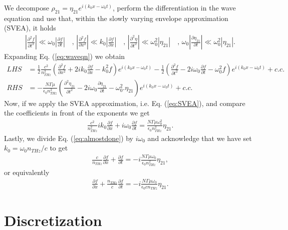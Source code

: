 \documentclass[preprint,secnumarabic,amssymb, nobibnotes, aip, prd]{revtex4-1}
\def\p{\partial}
\begin{document}
We decompose $\rho_{21}=\eta_{21}e^{i(k_0x-\omega_0t)}$, perform the differentiation in the wave equation and use that, within the slowly varying envelope approximation (SVEA), it holds
\begin{align}
\label{eq:SVEA}
\left |\frac{\p^2 f}{\p t^2}\right | \ll \omega_0\left|\frac{\p f}{\p t}\right| \quad \text{, } \left |\frac{\p^2 f}{\p x^2}\right | \ll k_0\left|\frac{\p f}{\p x}\right| \quad \text{, } \left |\frac{\p^2 \eta}{\p t^2}\right | \ll \omega_0^2 \left| \eta_{21}\right| \quad \text{, } \omega_0 \left| \frac{\p \eta_{21}}{\p t}\right| \ll  \omega_0^2\left|\eta_{21}\right|.
\end{align}
Expanding Eq. (\ref{eq:waveqn}) we obtain
\begin{align}
LHS &= \frac{1}{2} \frac{c^2}{n_{THz}^2} \left(\frac{\p^2 f}{\p x^2} +2ik_0 \frac{\p f}{\p x} -k_0^2 f\right)e^{i(k_0x-\omega_0t)} - \frac{1}{2}\left(\frac{\p^2 f}{\p t^2} -2i\omega_0 \frac{\p f}{\p t} -\omega_0^2 f\right)e^{i(k_0x-\omega_0t)} + c.c. \nonumber \\
RHS &= -\frac{N\Gamma\mu}{\epsilon_0 n_{THz}^2} \left(\frac{\p^2 \eta_{21}}{\p t^2} -2i\omega_0 \frac{\p \eta_{21}}{\p t} -\omega_0^2. \eta_{21}\right)e^{i(k_0x-\omega_0t)}+c.c.
\end{align}
Now, if we apply the SVEA approximation, i.e. Eq. (\ref{eq:SVEA}), and compare the coefficients in front of the exponents we get
\begin{align}
\label{eq:almostdone}
\frac{c^2}{n_{THz}^2}ik_0 \frac{\p f}{\p x}+i\omega_0 \frac{\p f}{\p t} = \frac{N\Gamma\mu\omega_0^2}{\epsilon_0 n_{THz}^2}\eta_{21}.
\end{align}
Lastly, we divide Eq. (\ref{eq:almostdone}) by $i\omega_0$ and acknowledge that we have set $k_0 = \omega_0 n_{THz}/c$ to get
\begin{align}
\label{eq:almostdone2}
\frac{c}{n_{THz}} \frac{\p f}{\p x}+ \frac{\p f}{\p t} = -i\frac{N\Gamma\mu\omega_0}{\epsilon_0 n_{THz}^2}\eta_{21},
\end{align}
or equivalently
\begin{align}
\label{eq:almostdone3}
\frac{\p f}{\p x}+ \frac{n_{THz}}{c} \frac{\p f}{\p t} = -i\frac{N\Gamma\mu\omega_0}{\epsilon_0 c n_{THz}}\eta_{21}.
\end{align}

\section{Discretization}
\end{document}
